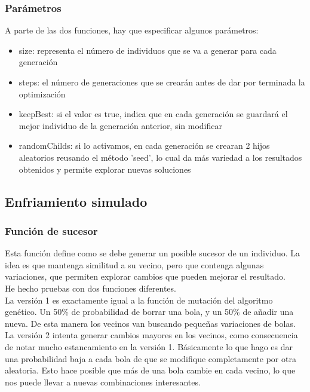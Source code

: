 \documentclass[a4paper, 11pt]{article}
\begin{document}
		\subsubsection{Parámetros}
		
			A parte de las dos funciones, hay que especificar algunos parámetros: \\
			\begin{itemize}
				\item size: representa el número de individuos que se va a generar para cada generación
				\item steps: el número de generaciones que se crearán antes de dar por terminada la optimización
				\item keepBest: si el valor es true, indica que en cada generación se guardará el mejor individuo de la generación anterior, sin modificar
				\item randomChilds: si lo activamos, en cada generación se crearan 2 hijos aleatorios reusando el método 'seed', lo cual da más variedad a los resultados obtenidos y permite explorar nuevas soluciones
			\end{itemize}
		
		
	\subsection{Enfriamiento simulado}
		\subsubsection{Función de sucesor}
			Esta función define como se debe generar un posible sucesor de un individuo. La idea es que mantenga similitud a su vecino, pero que contenga algunas variaciones, que permiten explorar cambios que pueden mejorar el resultado.\\ 
				
			He hecho pruebas con dos funciones diferentes.\\ 
			
			La versión 1 es exactamente igual a la función de mutación del algoritmo genético. Un 50\% de probabilidad de borrar una bola, y un 50\% de añadir una nueva. De esta manera los vecinos van buscando pequeñas variaciones de bolas. \\
			
			La versión 2 intenta generar cambios mayores en los vecinos, como consecuencia de notar mucho estancamiento en la versión 1. Básicamente lo que hago es dar una probabilidad baja a cada bola de que se modifique completamente por otra aleatoria. Esto hace posible que más de una bola cambie en cada vecino, lo que nos puede llevar a nuevas combinaciones interesantes.
\end{document}

